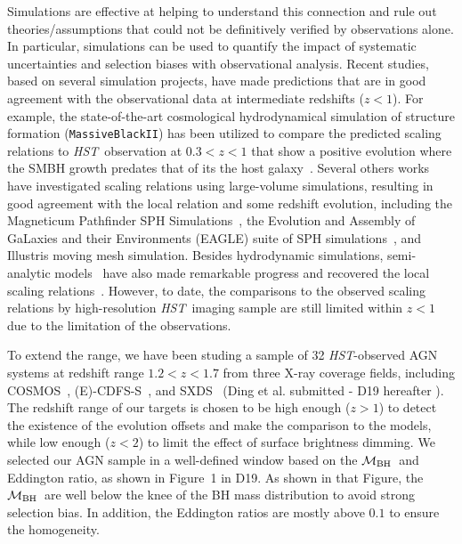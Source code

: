 \documentclass{natureprintstyle}
\newcommand{\hst}{{\it HST}}
\newcommand{\mbh}{$\mathcal M_{\rm BH}$}
\begin{document}
Simulations are effective at helping to understand this connection and rule out theories/assumptions that could not be definitively verified by observations alone. In particular, simulations can be used to quantify the impact of systematic uncertainties and selection biases with observational analysis. Recent studies, based on several simulation projects, have made predictions that are in good agreement with the observational data at intermediate redshifts ($z<1$). For example, the state-of-the-art cosmological hydrodynamical simulation of structure formation (\texttt{MassiveBlackII}) has been utilized to compare the predicted scaling relations to \hst\ observation at $0.3<z<1$ that show a positive evolution where the SMBH growth predates that of its the host galaxy~\cite{DeG++15}. Several others works have investigated scaling relations using large-volume simulations, resulting in good agreement with the local relation and some redshift evolution, including the Magneticum Pathfinder SPH Simulations~\cite{Steinborn2015}, the Evolution and Assembly of GaLaxies and their Environments (EAGLE) suite of SPH simulations~\cite{Schaye2015}, and Illustris moving mesh simulation\cite{Sijacki2015, Vogelsberger2014, Li2019}. Besides hydrodynamic simulations, semi-analytic models~\cite{Menci2014, Menci2016} have also made remarkable progress and recovered the local scaling relations~\cite{Kormendy13}. However, to date, the comparisons to the observed scaling relations by high-resolution \hst\ imaging sample are still limited within $z<1$ due to the limitation of the observations.

To extend the range, we have been studing a sample of 32 \hst-observed AGN systems at redshift range $1.2<z<1.7$ from three X-ray coverage fields, including COSMOS~\cite{Civano2016}, (E)-CDFS-S~\cite{Lehmer2005, Xue2011}, and SXDS~\cite{Ueda2008} (Ding et al. submitted - D19 hereafter ). The redshift range of our targets is chosen to be high enough ($z>1$) to detect the existence of the evolution offsets and make the comparison to the models, while low enough ($z<2$) to limit the effect of surface brightness dimming. 
We selected our AGN sample in a well-defined window based on the \mbh\ and Eddington ratio, as shown in Figure~1 in D19. As shown in that Figure, the \mbh\ are well below the knee of the BH mass distribution to avoid strong selection bias. In addition, the Eddington ratios are mostly above $0.1$ to ensure the homogeneity.
\end{document}
